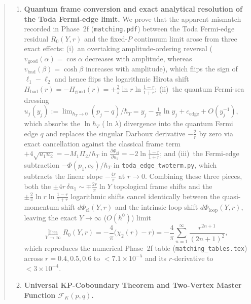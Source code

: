 \documentclass[11pt,a4paper]{article}
\newcommand{\hb}{\hbar}
\begin{document}
\begin{abstract}
\begin{enumerate}
\[\]
Meanwhile, the static Corrigan--Zambon defect at $x=0$ has $v_D=0$ (no moving
collective coordinate), explaining why one-loop momentum conservation in soliton
absorption by a static defect (Phase~2g) equates $\Delta P_D(q_{i+1})-\Delta P_D(q_i)$
to $\rho_i\Delta P_{\mathrm{mode}}(S_i)$, whereas
$\Delta P_{\mathrm{can}} - \Delta P_{\mathrm{mode}} = \frac{\epsilon}{\sin\alpha}\mathcal{A}_v(\alpha)$
is the collective-coordinate profile backreaction of a moving soliton.
\item \textbf{Quantum frame conversion and exact analytical resolution of the Toda Fermi-edge limit.}
We prove that the apparent mismatch recorded in Phase~2f (\texttt{matching.pdf})
between the Toda Fermi-edge residual $R_0(Y,r)$ and the fixed-$P$ continuum limit
arose from three exact effects:
(i)~an overtaking amplitude-ordering reversal ($v_{\mathrm{good}}(\alpha)=\cos\alpha$
decreases with amplitude, whereas $v_{\mathrm{bad}}(\beta)=\cosh\beta$ increases
with amplitude), which flips the sign of $\ell_1-\ell_2$ and hence flips the
logarithmic Hirota shift $H_{\mathrm{bad}}(r) = -H_{\mathrm{good}}(r) = +\frac{2}{\pi}\ln r\ln\frac{1-r}{1+r}$;
(ii)~the quantum Fermi-sea dressing $u_j(y_j) := \lim_{\hb_T\to 0}(p_j-q)/\hb_T = y_j - \frac{1}{2\pi}\ln y_j + c_{\mathrm{edge}} + O(y_j^{-1})$,
which absorbs the $\ln\hb_T$ ($\ln\lambda$) divergence into the quantum Fermi
edge $q$ and replaces the singular Darboux derivative $-\frac{2}{r}$ by zero via
exact cancellation against the classical frame term $+4\sqrt{u_1 u_2} = -M_1\Pi_2/\hb_T$
in $\frac{\partial\Phi_{\mathrm{cl}}}{\partial u_2} = -2\ln\frac{1-r}{1+r}$; and
(iii)~the Fermi-edge subtraction $-\Phi(p_1,e_2)/\hb_T$ in \texttt{toda\_edge\_twoterm.py},
which subtracts the linear slope $-\frac{4r}{\pi}$ at $r\to 0$. Combining these
three pieces, both the $\pm 4r\,\delta u_1 \sim \mp\frac{2r}{\pi}\ln Y$ topological
frame shifts and the $\pm\frac{2}{\pi}\ln r\ln\frac{1-r}{1+r}$ logarithmic shifts
cancel identically between the quasi-momentum shift $d\Phi_{\mathrm{cl}}(Y,r)$ and
the intrinsic loop shift $d\Phi_{\mathrm{loop}}(Y,r)$, leaving the exact
$Y\to\infty$ ($O(\hb^0)$) limit
\[
  \lim_{Y\to\infty} R_0(Y,r) = -\frac{4}{\pi}\big(\chi_2(r) - r\big)
  = -\frac{4}{\pi}\sum_{n=1}^\infty \frac{r^{2n+1}}{(2n+1)^2},
\]
which reproduces the numerical Phase~2f table (\texttt{matching\_tables.tex})
across $r=0.4,0.5,0.6$ to $< 7.1\times 10^{-5}$ and its $r$-derivative to
$< 3\times 10^{-4}$.
\item \textbf{Universal KP-Coboundary Theorem and Two-Vertex Master Function $\mathcal{F}_K(p,q)$.}

\end{enumerate}
\end{abstract}
\end{document}
